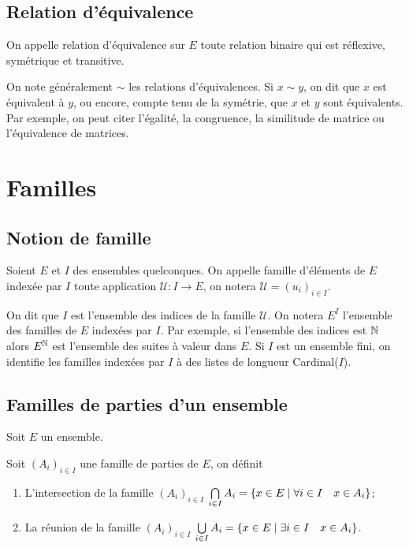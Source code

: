 \subsection{Relation d'équivalence}
\label{chap3-subsec:relationequivalence}

\begin{defdef}
    On appelle relation d'équivalence sur \(E\) toute relation binaire qui est 
    réflexive, symétrique et transitive.
\end{defdef}

On note généralement \(\sim\) les relations d'équivalences. Si \(x \sim y\), on 
dit que \(x\) est équivalent à \(y\), ou encore, compte tenu de la symétrie, que 
\(x\) et \(y\) sont équivalents. Par exemple, on peut citer l'égalité, la 
congruence, la similitude de matrice ou l'équivalence de matrices.

\section{Familles}
\label{chap3-sec:familles}

\subsection{Notion de famille}
\label{chap3-subsec:notionfamille}

\begin{defdef}
    Soient \(E\) et \(I\) des ensembles quelconques. On appelle famille 
    d'éléments de \(E\) indexée par \(I\) toute application \(\mathcal{U} : I 
    \longrightarrow E\), on notera \(\mathcal{U}=(u_i)_{i \in I}\).
\end{defdef}

On dit que \(I\) est l'ensemble des indices de la famille \(\mathcal{U}\). On 
notera \(E^I\) l'ensemble des familles de \(E\) indexées par \(I\). Par exemple, 
si l'ensemble des indices est \(\mathbb{N}\) alors \(E^{\mathbb{N}}\) est l'ensemble des suites 
à valeur dans \(E\). Si \(I\) est un ensemble fini, on identifie les familles 
indexées par \(I\) à des listes de longueur Cardinal(\(I\)).

\subsection{Familles de parties d'un ensemble}
\label{chap3-subsec:familledeparties}

Soit \(E\) un ensemble.

\begin{defdef}
    Soit \((A_i)_{i \in I}\) une famille de parties de \(E\), on définit
    \begin{enumerate}
        \item L'intersection de la famille \((A_i)_{i \in I}\)  
            \(\bigcap\limits_{i \in I} A_i = \left\{x \in E\mathrel{}\middle|\mathrel{}\forall i \in I 
            \quad x \in A_i\right\}\);
        \item La réunion de la famille \((A_i)_{i \in I}\)  \(\bigcup\limits_{i 
            \in I} A_i = \left\{x \in E\mathrel{}\middle|\mathrel{}\exists i \in I \quad x \in A_i\right\}\).
    \end{enumerate}
\end{defdef}

